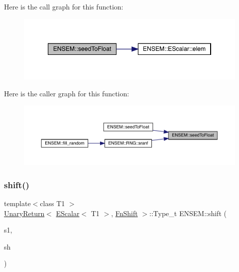 Here is the call graph for this function\+:
\nopagebreak
\begin{figure}[H]
\begin{center}
\leavevmode
\includegraphics[width=347pt]{d4/dca/group__escalar_ga7e479d7cf5ca7620a11e78b407b2e9c3_cgraph}
\end{center}
\end{figure}
Here is the caller graph for this function\+:
\nopagebreak
\begin{figure}[H]
\begin{center}
\leavevmode
\includegraphics[width=350pt]{d4/dca/group__escalar_ga7e479d7cf5ca7620a11e78b407b2e9c3_icgraph}
\end{center}
\end{figure}
\mbox{\label{group__escalar_gaeaac3a9b82b6d6c8f0ec25efb3242cfe}} 
\subsubsection{\texorpdfstring{shift()}{shift()}}
{\footnotesize\ttfamily template$<$class T1 $>$ \\
\mbox{\hyperlink{structENSEM_1_1UnaryReturn}{Unary\+Return}}$<$ \mbox{\hyperlink{classENSEM_1_1EScalar}{E\+Scalar}}$<$ T1 $>$, \mbox{\hyperlink{structENSEM_1_1FnShift}{Fn\+Shift}} $>$\+::Type\+\_\+t E\+N\+S\+E\+M\+::shift (\begin{DoxyParamCaption}\item[{const \mbox{\hyperlink{classENSEM_1_1EScalar}{E\+Scalar}}$<$ T1 $>$ \&}]{s1,  }\item[{int}]{sh }\end{DoxyParamCaption})\hspace{0.3cm}{\ttfamily [inline]}}

